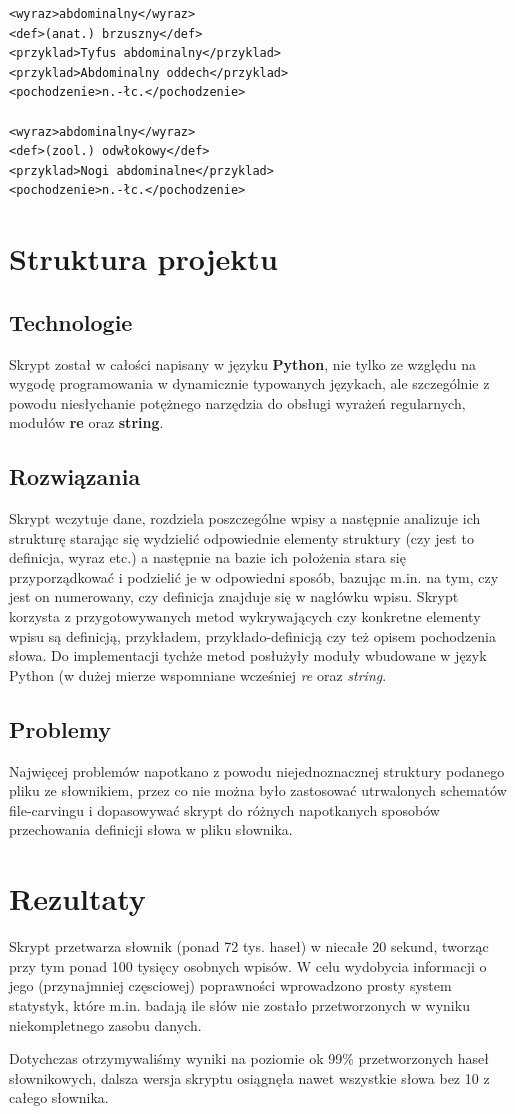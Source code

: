 \documentclass[12pt]{article}
\begin{document}
\begin{verbatim}
<wyraz>abdominalny</wyraz>
<def>(anat.) brzuszny</def>
<przyklad>Tyfus abdominalny</przyklad>
<przyklad>Abdominalny oddech</przyklad>
<pochodzenie>n.-łc.</pochodzenie>

<wyraz>abdominalny</wyraz>
<def>(zool.) odwłokowy</def>
<przyklad>Nogi abdominalne</przyklad>
<pochodzenie>n.-łc.</pochodzenie>

\end{verbatim}

\section{Struktura projektu}
\subsection{Technologie}
Skrypt został w całości napisany w języku \textbf{Python}, nie tylko ze względu na wygodę programowania
w dynamicznie typowanych językach, ale szczególnie z powodu niesłychanie potężnego narzędzia do obsługi
wyrażeń regularnych, modułów \textbf{re} oraz \textbf{string}.

\subsection{Rozwiązania}
Skrypt wczytuje dane, rozdziela poszczególne wpisy a następnie analizuje ich strukturę starając się wydzielić
odpowiednie elementy struktury (czy jest to definicja, wyraz etc.) a następnie na bazie ich położenia stara 
się przyporządkować i podzielić je w odpowiedni sposób, bazując m.in. na tym, czy jest on numerowany, czy definicja znajduje się w 
nagłówku wpisu.
Skrypt korzysta z przygotowywanych metod wykrywających czy konkretne elementy wpisu są definicją, przykładem, przykłado-definicją 
czy też opisem pochodzenia słowa. Do implementacji tychże metod posłużyły moduły wbudowane w język Python (w dużej mierze wspomniane
wcześniej \textit{re} oraz \textit{string}.

\subsection{Problemy}
Najwięcej problemów napotkano z powodu niejednoznacznej struktury podanego pliku ze słownikiem,
przez co nie można było zastosować utrwalonych schematów file-carvingu i dopasowywać skrypt do różnych
napotkanych sposobów przechowania definicji słowa w pliku słownika.

\section{Rezultaty}
Skrypt przetwarza słownik (ponad 72 tys. haseł) w niecałe 20 sekund, tworząc przy tym ponad 100 tysięcy osobnych wpisów.
W celu wydobycia informacji o jego (przynajmniej częsciowej) poprawności wprowadzono prosty system statystyk, które m.in. 
badają ile słów nie zostało przetworzonych w wyniku niekompletnego zasobu danych.

Dotychczas otrzymywaliśmy wyniki na poziomie ok 99\% przetworzonych haseł słownikowych, dalsza wersja skryptu osiągnęła
nawet wszystkie słowa bez 10 z całego słownika.
\end{document}
